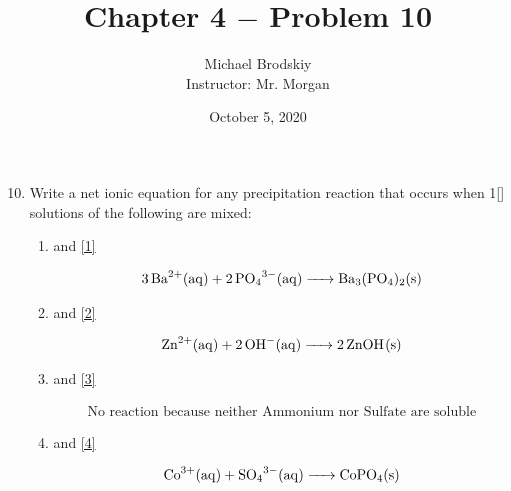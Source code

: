 \documentclass[12pt]{article}
\title{Chapter 4 $-$ Problem 10}
\date{October 5, 2020}
\author{Michael Brodskiy\\ \small Instructor: Mr. Morgan}
\begin{document}
\maketitle

\begin{enumerate}

    \setcounter{enumi}{9}

  \item Write a net ionic equation for any precipitation reaction that occurs when 1[\si{\Molar}] solutions of the following are mixed:

    \begin{enumerate}

      \item {} and  \eqref{1}

        \begin{equation}
          \begin{split}
            \ce{3Ba^2+(aq) + 2PO4^3-(aq) -> Ba3(PO4)2(s)}
          \end{split}
          \label{1}
        \end{equation}

      \item {} and  \eqref{2}

        \begin{equation}
          \begin{split}
            \ce{Zn^2+(aq) + 2OH-(aq) -> 2ZnOH(s)}
          \end{split}
          \label{2}
        \end{equation}

      \item {} and  \eqref{3}

        \begin{equation}
          \begin{split}
            \text{No reaction because neither Ammonium nor Sulfate are soluble}
          \end{split}
          \label{3}
        \end{equation}

      \item {} and  \eqref{4}

        \begin{equation}
          \ce{Co^3+(aq) + SO4^3-(aq) -> CoPO4(s)}
          \label{4}
        \end{equation}

    \end{enumerate}

\end{enumerate}
\end{document}
